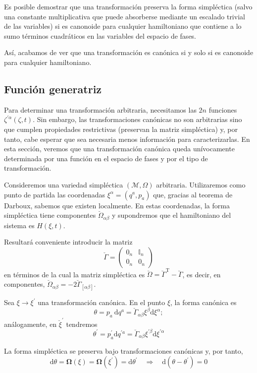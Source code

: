 Es posible demostrar  que una transformación preserva la forma simpléctica (salvo una constante multiplicativa que puede absorberse mediante un escalado trivial de las variables) si es canonoide para cualquier hamiltoniano que contiene a lo sumo términos cuadráticos en las variables del espacio de fases.

Así, acabamos de ver que una transformación es canónica si y solo si es canonoide para cualquier hamiltoniano.
\subsection{Función generatriz}
Para determinar una transformación arbitraria, necesitamos las $2 n$ funciones $\zeta^{\prime \alpha}(\zeta, t)$. Sin embargo, las transformaciones canónicas no son arbitrarias sino que cumplen propiedades restrictivas (preservan la matriz simpléctica) y, por tanto, cabe esperar que sea necesaria menos información para caracterizarlas. En esta sección, veremos que una transformación canónica queda unívocamente determinada por una función en el espacio de fases y por el tipo de transformación.

Consideremos una variedad simpléctica $(\mathscr{M}, \Omega)$ arbitraria. Utilizaremos como punto de partida las coordenadas $\xi^{\alpha}=\left(q^{a}, p_{a}\right)$ que, gracias al teorema de Darboux, sabemos que existen localmente. En estas coordenadas, la forma simpléctica tiene componentes $\breve{\Omega}_{\alpha \beta}$ y supondremos que el hamiltoniano del sistema es $H(\xi, t)$.

Resultará conveniente introducir la matriz
$$
\check{\Gamma}=\left(\begin{array}{ll}
0_{n} & \mathbb{I}_{n} \\
0_{n} & 0_{n}
\end{array}\right)
$$
en términos de la cual la matriz simpléctica es $\breve{\Omega}=\breve{\Gamma}^{\mathrm{T}}-\breve{\Gamma}$, es decir, en componentes, $\breve{\Omega}_{\alpha \beta}=-2 \breve{\Gamma}_{[\alpha \beta]}$.

Sea $\xi \rightarrow \xi^{\prime}$ una transformación canónica. En el punto $\xi$, la forma canónica es
$$
\theta=p_{a} \mathrm{~d} q^{a}=\check{\Gamma}_{\alpha \beta} \xi^{\beta} \mathrm{d} \xi^{\alpha} ;
$$
análogamente, en $\breve{\xi}^{\prime}$ tendremos
$$
\theta^{\prime}=p_{a}^{\prime} \mathrm{d} q^{\prime a}=\breve{\Gamma}_{\alpha \beta} \xi^{\prime \beta} \mathrm{d} \xi^{\prime \alpha}
$$

La forma simpléctica se preserva bajo transformaciones canónicas y, por tanto,
$$
\mathrm{d} \theta=\boldsymbol{\Omega}(\xi)=\boldsymbol{\Omega}\left(\xi^{\prime}\right)=\mathrm{d} \theta^{\prime} \quad \Rightarrow \quad \mathrm{d}\left(\theta-\theta^{\prime}\right)=0
$$

